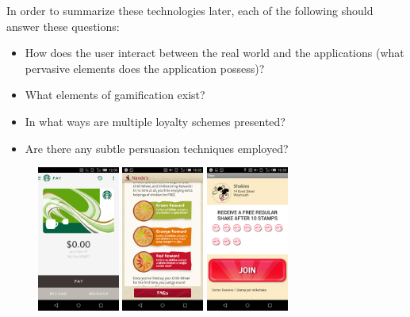 In order to summarize these technologies later, each of the following should answer these questions:
\begin{itemize}
  \item How does the user interact between the real world and the applications (what pervasive elements does the application possess)?
  \item What elements of gamification exist?
    \item In what ways are multiple loyalty schemes presented? %
  \item Are there any subtle persuasion techniques employed?
\end{itemize}


\begin{figure}[H]
  \centering
    \includegraphics[width=0.24\textwidth]{img/starbucks.png}
    \includegraphics[width=0.24\textwidth]{img/nandos.png}
    \includegraphics[width=0.24\textwidth]{img/tagmate.png}

\end{figure}
